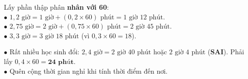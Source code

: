 \documentclass[14pt,a4paper,oneside]{extbook}
\begin{document}
\vspace{3mm}

\noindent
\begin{minipage}[t]{0.54\textwidth}
  \begin{tcolorbox}[
    enhanced,
    title={\footnotesize\bfseries\color{white}\faBolt\ Cách đổi phần thập phân của giờ ra phút},
    colback=green!3!white,
    colframe=green!60!black,
    arc=2.5mm, boxrule=0.8pt, top=1.8mm, bottom=1.8mm, left=2.2mm, right=2.2mm
  ]
    \footnotesize
    Lấy phần thập phân \textbf{nhân với 60}:\\
    $\bullet$ $1,2\text{ giờ} = 1\text{ giờ} + (0,2 \times 60)\text{ phút} = 1\text{ giờ } 12\text{ phút}$.\\
    $\bullet$ $2,75\text{ giờ} = 2\text{ giờ} + (0,75 \times 60)\text{ phút} = 2\text{ giờ } 45\text{ phút}$.\\
    $\bullet$ $3,3\text{ giờ} = 3\text{ giờ } 18\text{ phút}$ (vì $0,3 \times 60 = 18$).
  \end{tcolorbox}
\end{minipage}%
\hfill
\begin{minipage}[t]{0.44\textwidth}
  \begin{tcolorbox}[
    enhanced,
    title={\footnotesize\bfseries\color{white}\faExclamationTriangle\ Mẹo tránh bẫy trắc nghiệm},
    colback=red!2!white,
    colframe=red!70!black,
    arc=2.5mm, boxrule=0.8pt, top=1.8mm, bottom=1.8mm, left=2.2mm, right=2.2mm
  ]
    \footnotesize
    $\bullet$ Rất nhiều học sinh đổi: $2,4\text{ giờ} = 2\text{ giờ } 40\text{ phút}$ hoặc $2\text{ giờ } 4\text{ phút}$ (\textbf{SAI}). Phải lấy $0,4 \times 60 = \mathbf{24\text{ phút}}$.\\
    $\bullet$ Quên cộng thời gian nghỉ khi tính thời điểm đến nơi.
  \end{tcolorbox}
\end{minipage}
\end{document}
